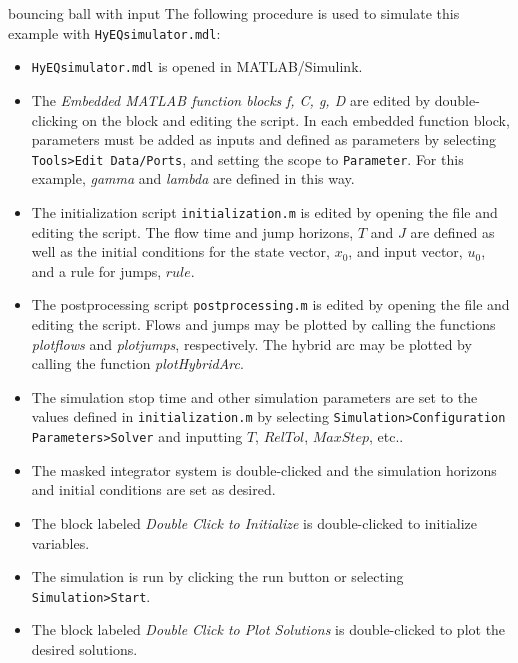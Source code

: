 \begin{example}{bouncing ball with input}
\noindent The following procedure is used to simulate this example with {\tt HyEQsimulator.mdl}:
\begin{itemize}
\item {\tt HyEQsimulator.mdl} is opened in MATLAB/Simulink.
\item The {\em Embedded MATLAB function blocks} {\em f, C, g, D} are edited by double-clicking on the block and editing the script. In each embedded function block, parameters must be added as inputs and defined as parameters by selecting {\tt Tools>Edit Data/Ports}, and setting the scope to {\tt Parameter}. For this example, {\em gamma} and {\em lambda} are defined in this way.
\item The initialization script {\tt initialization.m} is edited by opening the file and editing the script. The flow time and jump horizons, $T$ and $J$ are defined as well as the initial conditions for the state vector, $x_0$, and input vector, $u_0$, and a rule for jumps, $rule$.
\item The postprocessing script {\tt postprocessing.m} is edited by opening the file and editing the script. Flows and jumps may be plotted by calling the functions {\em plotflows} and {\em plotjumps}, respectively. The hybrid arc may be plotted by calling the function {\em plotHybridArc}.
\item The simulation stop time and other simulation parameters are set to the values defined in {\tt initialization.m} by selecting {\tt Simulation>Configuration Parameters>Solver} and inputting $T$, $RelTol$, $MaxStep$, etc..
\item The masked integrator system is double-clicked and the simulation horizons and initial conditions are set as desired.
\item The block labeled {\em Double Click to Initialize} is double-clicked to initialize variables.
\item The simulation is run by clicking the run button or selecting {\tt Simulation>Start}.
\item The block labeled {\em Double Click to Plot Solutions} is double-clicked to plot the desired solutions.
\end{itemize}

%


\end{example}
